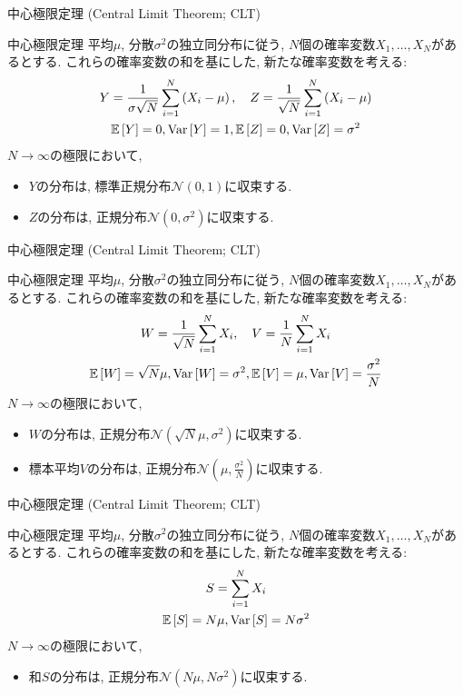 \documentclass[dvipdfmx,notheorems,t]{beamer}
\begin{document}
\begin{frame}{中心極限定理 (Central Limit Theorem; CLT)}
\begin{block}{中心極限定理}
  平均$\mu$, 分散$\sigma^2$の独立同分布に従う, $N$個の確率変数$X_1, \ldots, X_N$があるとする.
  これらの確率変数の和を基にした, 新たな確率変数を考える:
  \begin{gather*}
    Y = \frac{1}{\sigma \sqrt{N}} \sum_{i = 1}^N \left( X_i - \mu \right), \quad
    Z = \frac{1}{\sqrt{N}} \sum_{i = 1}^N \left( X_i - \mu \right) \\
    \operatorname{\mathbb{E}} \left[ Y \right] = 0, \operatorname{Var} \left[ Y \right] = 1, \operatorname{\mathbb{E}} \left[ Z \right] = 0, \operatorname{Var} \left[ Z \right] = \sigma^2
  \end{gather*}
  $N \to \infty$の極限において,
  \begin{itemize}
    \item $Y$の分布は, 標準正規分布$\mathcal{N}(0, 1)$に収束する.
    \item $Z$の分布は, 正規分布$\mathcal{N}(0, \sigma^2)$に収束する.
  \end{itemize}
\end{block}
\end{frame}

\begin{frame}{中心極限定理 (Central Limit Theorem; CLT)}
\begin{block}{中心極限定理}
  平均$\mu$, 分散$\sigma^2$の独立同分布に従う, $N$個の確率変数$X_1, \ldots, X_N$があるとする.
  これらの確率変数の和を基にした, 新たな確率変数を考える:
  \begin{gather*}
    W = \frac{1}{\sqrt{N}} \sum_{i = 1}^N X_i, \quad
    V = \frac{1}{N} \sum_{i = 1}^N X_i \\
    \operatorname{\mathbb{E}} \left[ W \right] = \sqrt{N} \mu, \operatorname{Var} \left[ W \right] = \sigma^2, \operatorname{\mathbb{E}} \left[ V \right] = \mu, \operatorname{Var} \left[ V \right] = \frac{\sigma^2}{N}
  \end{gather*}
  $N \to \infty$の極限において,
  \begin{itemize}
    \item $W$の分布は, 正規分布$\mathcal{N}(\sqrt{N} \mu, \sigma^2)$に収束する.
    \item 標本平均$V$の分布は, 正規分布$\mathcal{N}(\mu, \frac{\sigma^2}{N})$に収束する.
  \end{itemize}
\end{block}
\end{frame}

\begin{frame}{中心極限定理 (Central Limit Theorem; CLT)}
\begin{block}{中心極限定理}
  平均$\mu$, 分散$\sigma^2$の独立同分布に従う, $N$個の確率変数$X_1, \ldots, X_N$があるとする.
  これらの確率変数の和を基にした, 新たな確率変数を考える:
  \begin{gather*}
    S = \sum_{i = 1}^N X_i \\
    \operatorname{\mathbb{E}} \left[ S \right] = N \mu, \operatorname{Var} \left[ S \right] = N \sigma^2
  \end{gather*}
  $N \to \infty$の極限において,
  \begin{itemize}
    \item 和$S$の分布は, 正規分布$\mathcal{N}(N \mu, N \sigma^2)$に収束する.
  \end{itemize}
\end{block}
\end{frame}
\end{document}
